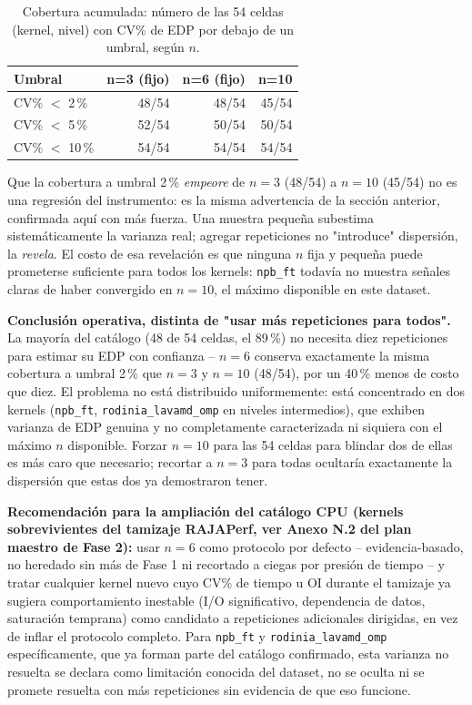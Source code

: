 \begin{table}[H]
\centering
\caption{Cobertura acumulada: número de las 54 celdas (kernel, nivel) con CV\% de EDP por debajo de un umbral, según $n$.}
\label{tab:edp-convergence-coverage}
\begin{tabular}{@{}lrrr@{}}
\toprule
\textbf{Umbral} & \textbf{n=3 (fijo)} & \textbf{n=6 (fijo)} & \textbf{n=10} \\
\midrule
CV\% $<$ 2\,\%  & 48/54 & 48/54 & 45/54 \\
CV\% $<$ 5\,\%  & 52/54 & 50/54 & 50/54 \\
CV\% $<$ 10\,\% & 54/54 & 54/54 & 54/54 \\
\bottomrule
\end{tabular}
\end{table}

Que la cobertura a umbral 2\,\% \emph{empeore} de $n=3$ (48/54) a $n=10$
(45/54) no es una regresión del instrumento: es la misma advertencia de
la sección anterior, confirmada aquí con más fuerza. Una muestra pequeña
subestima sistemáticamente la varianza real; agregar repeticiones no
"introduce" dispersión, la \emph{revela}. El costo de esa revelación es
que ninguna $n$ fija y pequeña puede prometerse suficiente para todos los
kernels: \texttt{npb\_ft} todavía no muestra señales claras de haber
convergido en $n=10$, el máximo disponible en este dataset.

\textbf{Conclusión operativa, distinta de "usar más repeticiones para
todos".} La mayoría del catálogo (48 de 54 celdas, el 89\,\%) no necesita
diez repeticiones para estimar su EDP con confianza -- $n=6$ conserva
exactamente la misma cobertura a umbral 2\,\% que $n=3$ y $n=10$ (48/54),
por un 40\,\% menos de costo que diez. El problema no está distribuido
uniformemente: está concentrado en dos kernels (\texttt{npb\_ft},
\texttt{rodinia\_lavamd\_omp} en niveles intermedios), que exhiben
varianza de EDP genuina y no completamente caracterizada ni siquiera con
el máximo $n$ disponible. Forzar $n=10$ para las 54 celdas para blindar
dos de ellas es más caro que necesario; recortar a $n=3$ para todas
ocultaría exactamente la dispersión que estas dos ya demostraron tener.

\textbf{Recomendación para la ampliación del catálogo CPU (kernels
sobrevivientes del tamizaje RAJAPerf, ver Anexo N.2 del plan maestro de
Fase 2):} usar $n=6$ como protocolo por defecto -- evidencia-basado, no
heredado sin más de Fase 1 ni recortado a ciegas por presión de tiempo -- y
tratar cualquier kernel nuevo cuyo CV\% de tiempo u OI durante el
tamizaje ya sugiera comportamiento inestable (I/O significativo,
dependencia de datos, saturación temprana) como candidato a repeticiones
adicionales dirigidas, en vez de inflar el protocolo completo. Para
\texttt{npb\_ft} y \texttt{rodinia\_lavamd\_omp} específicamente, que ya
forman parte del catálogo confirmado, esta varianza no resuelta se declara
como limitación conocida del dataset, no se oculta ni se promete resuelta
con más repeticiones sin evidencia de que eso funcione.
